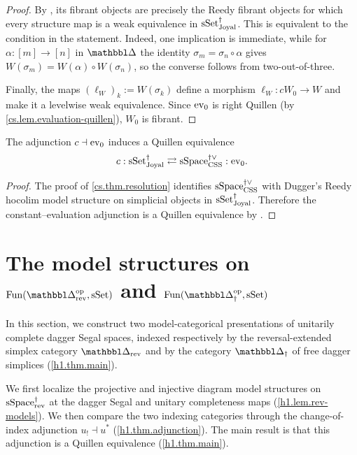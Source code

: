 \documentclass[a4paper,dvipdfmx,11pt]{amsart}
\begin{document}
\begin{proof}
  By \cite[Theorem~5.7 (c)]{Dug01R}, its fibrant objects are precisely the Reedy fibrant objects for which every structure map is a weak equivalence in $\mathrm{sSet}^{\dag}_{\mathrm{Joyal}}$.
  This is equivalent to the condition in the statement.
  Indeed, one implication is immediate, while for $\alpha:[m]\to[n]$ in $\prism$ the identity $\sigma_m=\sigma_n\circ\alpha$ gives $W(\sigma_m)=W(\alpha)\circ W(\sigma_n)$, so the converse follows from two-out-of-three.

  Finally, the maps $(\ell_W)_k:=W(\sigma_k)$ define a morphism $\ell_W:cW_0\to W$ and make it a levelwise weak equivalence.
  Since $\mathrm{ev}_0$ is right Quillen (by \cref{cs.lem.evaluation-quillen}), $W_0$ is fibrant.
\end{proof}

\begin{theorem}\label{cs.thm.equivalence}
  The adjunction $c\dashv\mathrm{ev}_0$ induces a Quillen equivalence
  \begin{align}
    c:
    \mathrm{sSet}^{\dag}_{\mathrm{Joyal}}
    \rightleftarrows
    \mathrm{sSpace}^{\dag\vee}_{\mathrm{CSS}}
    :\mathrm{ev}_0 .
  \end{align}
\end{theorem}

\begin{proof}
  The proof of \cref{cs.thm.resolution} identifies $\mathrm{sSpace}^{\dag\vee}_{\mathrm{CSS}}$ with Dugger's Reedy hocolim model structure on simplicial objects in $\mathrm{sSet}^{\dag}_{\mathrm{Joyal}}$.
  Therefore the constant--evaluation adjunction is a Quillen equivalence by \cite[Theorem~6.1]{Dug01R}.
\end{proof}


\section{The model structures on \texorpdfstring{$\Fun(\prism_{\rev}^{\myop},\sSet)$}{Fun(Δ,sSet)} and \texorpdfstring{$\Fun(\prism_{\dag}^{\myop},\sSet)$}{Fun(Δ,sSet)}}\label{h1.section}

In this section, we construct two model-categorical presentations of unitarily complete dagger Segal spaces, indexed respectively by the reversal-extended simplex category $\prism_{\rev}$ and by the category $\prism_{\dag}$ of free dagger simplices (\cref{h1.thm.main}).

We first localize the projective and injective diagram model structures on $\mathrm{sSpace}^{\dag}_{\mathrm{rev}}$ at the dagger Segal and unitary completeness maps (\cref{h1.lem.rev-models}).
We then compare the two indexing categories through the change-of-index adjunction $u_{!}\dashv u^{*}$ (\cref{h1.thm.adjunction}).
The main result is that this adjunction is a Quillen equivalence (\cref{h1.thm.main}).
\end{document}
